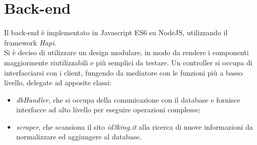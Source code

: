 \documentclass[11pt]{report}
\begin{document}
\section{Back-end}
Il back-end è implementato in Javascript ES6 su NodeJS, utilizzando il framework \textit{Hapi}.
\\Si è deciso di utilizzare un design modulare, in modo da rendere i componenti maggiormente riutilizzabili e più semplici da testare.
Un controller si occupa di interfacciarsi con i client, fungendo da mediatore con le funzioni più a basso livello, delegate ad apposite classi:
\begin{itemize}
	\item \textit{dbHandler}, che si occupa della comunicazione con il database e fornisce interfacce ad alto livello per eseguire operazioni complesse;
	\item \textit{scraper}, che scansiona il sito \textit{id3king.it} alla ricerca di nuove informazioni da normalizzare ed aggiungere al database.
\end{itemize}
\end{document}
